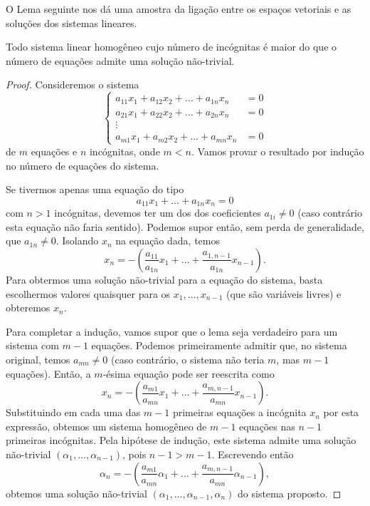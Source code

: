 O Lema seguinte nos dá uma amostra da ligação entre os espaços vetoriais e as soluções dos sistemas lineares.

\begin{lema}\label{lema:sistemahomogeneo}
  Todo sistema linear homogêneo cujo número de incógnitas é maior do que o número de equações admite uma solução não-trivial.
\end{lema}
\begin{proof}
Consideremos o sistema
\begin{equation*}
	\begin{cases}
	    a_{11}x_1 + a_{12}x_2 + \ldots + a_{1n}x_n &= 0\\
	    a_{21}x_1 + a_{22}x_2 + \ldots + a_{2n}x_n &= 0\\
	    \vdots & \\
	    a_{m1}x_1 + a_{m2}x_2 + \ldots + a_{mn}x_n &= 0
  \end{cases}
\end{equation*}
de $m$ equações e $n$ incógnitas, onde $m<n$. Vamos provar o resultado por indução no número de equações do sistema.

Se tivermos apenas uma equação do tipo
\begin{equation*}
  a_{11}x_1 + \ldots + a_{1n}x_n = 0
\end{equation*}
com $n>1$ incógnitas, devemos ter um dos dos coeficientes $a_{1i}\ne 0$ (caso contrário esta equação não faria sentido). Podemos supor então, sem perda de generalidade, que $a_{1n}\ne 0$. Isolando $x_n$ na equação dada, temos
\begin{equation*}
  x_n = - \left( \frac{a_{11}}{a_{1n}} x_1 + \ldots + \frac{a_{1,n-1}}{a_{1n}} x_{n-1}\right).
\end{equation*}
Para obtermos uma solução não-trivial para a equação do sistema, basta escolhermos valores quaisquer para os $x_1,\ldots,x_{n-1}$ (que são variáveis livres) e obteremos $x_n$.

Para completar a indução, vamos supor que o lema seja verdadeiro para um sistema com $m-1$ equações. Podemos primeiramente admitir que, no sistema original, temos $a_{mn} \ne 0$ (caso contrário, o sistema não teria $m$, mas $m-1$ equações). Então, a $m$-ésima equação pode ser reescrita como
\begin{equation*}
  x_n = -\left( \frac{a_{m1}}{a_{mn}} x_1 + \ldots + \frac{a_{m,n-1}}{a_{mn}} x_{n-1}\right).
\end{equation*}
Substituindo em cada uma das $m-1$ primeiras equações a incógnita $x_n$ por esta expressão, obtemos um sistema homogêneo de $m-1$ equações nas $n-1$ primeiras incógnitas. Pela hipótese de indução, este sistema admite uma solução não-trivial $(\alpha_1,\ldots,\alpha_{n-1})$, pois $n-1>m-1$. Escrevendo então
\begin{equation*}
  \alpha_n = -\left( \frac{a_{m1}}{a_{mn}} \alpha_1 + \ldots + \frac{a_{m,n-1}}{a_{mn}}\alpha_{n-1}\right),
\end{equation*}
obtemos uma solução não-trivial $(\alpha_1,\ldots,\alpha_{n-1},\alpha_n)$ do sistema proposto.
\end{proof}

